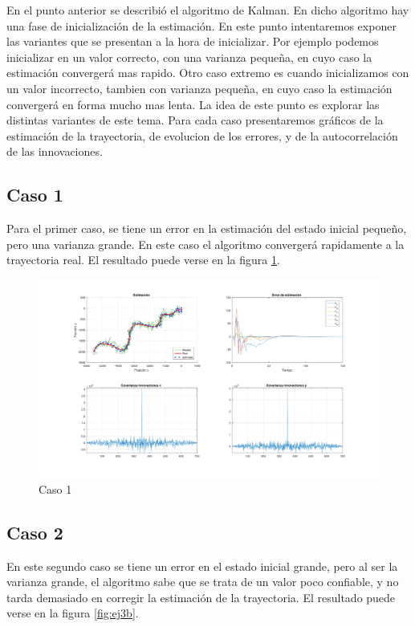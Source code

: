 
	En el punto anterior se describió el algoritmo de Kalman. En dicho algoritmo hay una fase de inicialización de la estimación. En este punto intentaremos exponer las variantes que se presentan a la hora de inicializar. Por ejemplo podemos inicializar en un valor correcto, con una varianza pequeña, en cuyo caso la estimación convergerá mas rapido. Otro caso extremo es cuando inicializamos con un valor incorrecto, tambien con varianza pequeña, en cuyo caso la estimación convergerá en forma mucho mas lenta. La idea de este punto es explorar las distintas variantes de este tema. Para cada caso presentaremos gráficos de la estimación de la trayectoria, de evolucion de los errores, y de la autocorrelación de las innovaciones.
	
	\subsection{Caso 1}
	
		Para el primer caso, se tiene un error en la estimación del estado inicial pequeño, pero una varianza grande. En este caso el algoritmo convergerá rapidamente a la trayectoria real. El resultado puede verse en la figura \ref{fig:ej3a}.
	
		\begin{figure}[H]
			\centering
			\includegraphics[width=1.0\textwidth,keepaspectratio]{Figuras/graf_ej3a.pdf}
			\caption{Caso 1}
			\label{fig:ej3a}
		\end{figure}
	
	\subsection{Caso 2}
	
	En este segundo caso se tiene un error en el estado inicial grande, pero al ser la varianza grande, el algoritmo sabe que se trata de un valor poco confiable, y no tarda demasiado en corregir la estimación de la trayectoria. El resultado puede verse en la figura \ref{fig:ej3b}.
		
